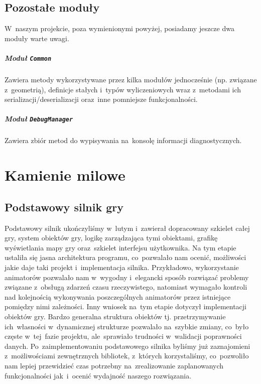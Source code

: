 \documentclass[licencjacka]{pracamgr}
\begin{document}
  \section{Pozostałe moduły}
    W~naszym projekcie, poza wymienionymi powyżej, posiadamy jeszcze dwa moduły warte uwagi.
    \paragraph{Moduł \texttt{Common}}
      Zawiera metody wykorzystywane przez kilka modułów jednocześnie (np. związane z~geometrią), definicje stałych i~typów wyliczeniowych
      wraz z~metodami ich serializacji/deserializacji oraz~inne pomniejsze funkcjonalności.
    \paragraph{Moduł \texttt{DebugManager}}
      Zawiera zbiór metod do wypisywania na~konsolę informacji diagnostycznych.

  \chapter{Kamienie milowe}
  \label{ch:KamienieMilowe}
    \section{Podstawowy silnik gry}
    Podstawowy silnik ukończyliśmy w~lutym i~zawierał dopracowany szkielet całej gry, system obiektów gry,
    logikę zarządzająca tymi obiektami, grafikę wyświetlania mapy gry oraz~szkielet interfejsu użytkownika.
    Na tym etapie ustaliła się jasna architektura programu, co~pozwalało nam ocenić, możliwości jakie
    daje taki projekt i~implementacja silnika. Przykładowo, wykorzystanie animatorów pozwalało nam w~wygodny
    i~elegancki sposób rozwiązać problemy związane z~obsługą zdarzeń czasu rzeczywistego, natomiast wymagało kontroli
    nad kolejnością wykonywania poszczególnych animatorów przez istniejące pomiędzy nimi zależności. Inny wniosek
    na~tym etapie dotyczył implementacji obiektów gry. Bardzo generalna struktura obiektów tj. przetrzymywanie
    ich~własności w~dynamicznej strukturze pozwalało na~szybkie zmiany, co~było częste w~tej~fazie projektu,
    ale~sprawiało trudności w~walidacji poprawności danych.
    Po~zaimplementowaniu podstawowego silnika byliśmy już zaznajomieni z~możliwościami zewnętrznych bibliotek,
    z~których korzystaliśmy, co~pozwoliło nam lepiej przewidzieć czas potrzebny na~zrealizowanie zaplanowanych
    funkcjonalności jak~i~ocenić wydajność naszego rozwiązania.
\end{document}
